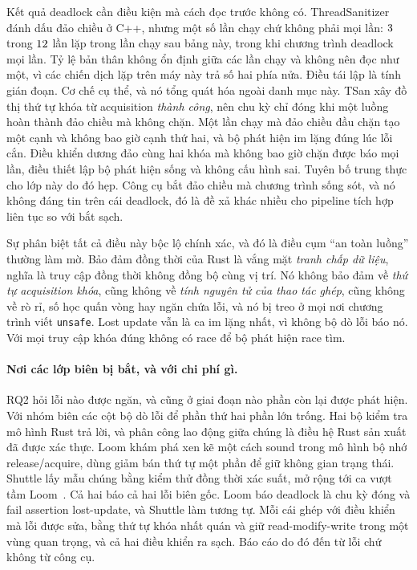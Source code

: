 Kết quả deadlock cần điều kiện mà cách đọc trước không có.
ThreadSanitizer đánh dấu đảo chiều ở C++, nhưng một số lần chạy chứ không phải mọi lần:
$3$ trong $12$ lần lặp trong lần chạy sau bảng này, trong khi
chương trình deadlock mọi lần. Tỷ lệ bản thân không ổn định giữa các lần chạy và không nên đọc
như một, vì các chiến dịch lặp trên máy này trả số hai phía nửa. Điều
tái lập là tính gián đoạn. Cơ chế cụ thể, và nó tổng quát hóa ngoài danh mục này. TSan xây đồ thị thứ tự khóa từ acquisition \emph{thành công}, nên chu kỳ chỉ đóng khi một luồng hoàn thành
đảo chiều mà không chặn. Một lần chạy mà đảo chiều đầu chặn tạo một cạnh và
không bao giờ cạnh thứ hai, và bộ phát hiện im lặng đúng lúc lỗi cắn. Điều khiển dương đảo cùng hai khóa mà không bao giờ chặn được báo mọi lần,
điều thiết lập bộ phát hiện sống và không cấu hình sai. Tuyên bố
trung thực cho lớp này do đó hẹp. Công cụ bắt đảo chiều mà chương trình sống sót,
và nó không đáng tin trên cái deadlock, đó là đề xả khác nhiều cho
pipeline tích hợp liên tục so với bắt sạch.

Sự phân biệt tất cả điều này bộc lộ chính xác, và đó là điều cụm ``an toàn
luồng'' thường làm mờ. Bảo đảm đồng thời của Rust là vắng mặt \emph{tranh chấp dữ liệu},
nghĩa là truy cập đồng thời không đồng bộ cùng vị trí. Nó không bảo đảm về
\emph{thứ tự acquisition khóa}, cũng không về \emph{tính nguyên tử của thao tác ghép}, cũng không
về rò rỉ, số học quấn vòng hay ngăn chứa lỗi, và nó bị treo ở mọi nơi chương trình viết \texttt{unsafe}. Lost update vẫn là ca
im lặng nhất, vì không bộ dò lỗi báo nó. Với mọi truy cập khóa đúng không có race để
bộ phát hiện race tìm.

\paragraph{Nơi các lớp biên bị bắt, và với chi phí gì.}
RQ2 hỏi lỗi nào được ngăn, và cũng ở giai đoạn nào phần còn lại được phát hiện. Với
nhóm biên các cột bộ dò lỗi để phần thứ hai phần lớn trống. Hai bộ kiểm tra mô hình Rust
trả lời, và phân công lao động giữa chúng là điều hệ Rust sản xuất
đã được xác thực. Loom khám phá xen kẽ một cách sound trong mô hình bộ nhớ release/acquire,
dùng giảm bán thứ tự một phần để giữ không gian trạng thái. Shuttle lấy mẫu
chúng bằng kiểm thử đồng thời xác suất, mở rộng tới ca vượt tầm Loom~\cite{bornholt2021shardstore}. Cả hai báo cả
hai lỗi biên gốc. Loom báo deadlock là chu kỳ đóng và fail assertion lost-update, và Shuttle làm tương tự. Mỗi cái ghép với điều khiển mà lỗi
được sửa, bằng thứ tự khóa nhất quán và giữ read-modify-write trong một vùng
quan trọng, và cả hai điều khiển ra sạch. Báo cáo do đó đến từ lỗi
chứ không từ công cụ.

